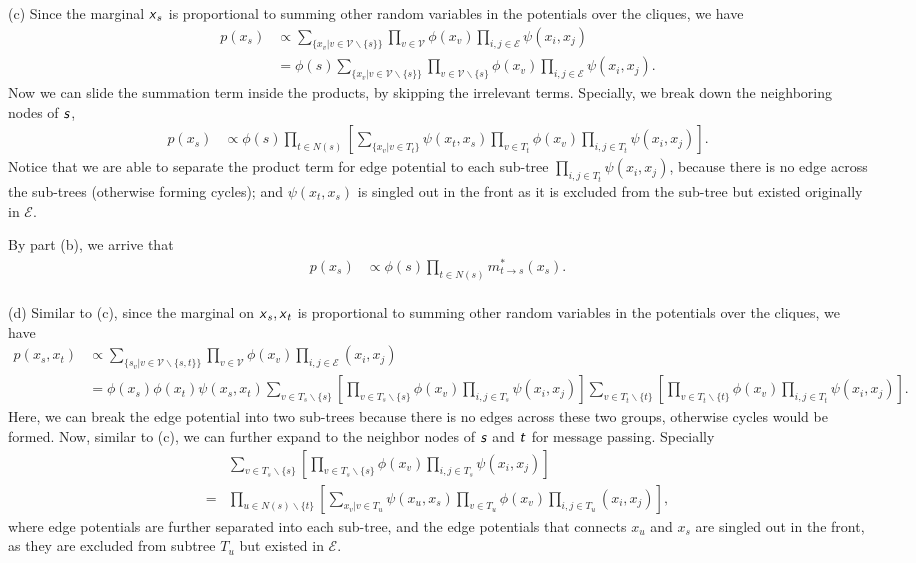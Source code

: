 \documentclass{article}
\newcommand{\s}[1]{\textsf{\textit{#1}}}
\newcommand{\qeds}{\hfill\qedsymbol}
\begin{document}
\noindent
(c) Since the marginal $\s{x}_s$ is proportional to summing other random variables in the potentials over the cliques, we have
\begin{align*}
	p(x_s) &\propto \sum_{\big\{x_v|v\in\mathscr{V}\backslash\{s\}\big\}}\prod_{v\in\mathscr{V}}\phi(x_v)\prod_{i,j\in\mathscr{E}}\psi(x_i, x_j)\\
	&=\phi(s) \sum_{\big\{x_v|v\in\mathscr{V}\backslash\{s\}\big\}}\prod_{v\in\mathscr{V}\backslash\{s\}}\phi(x_v)\prod_{i,j\in\mathscr{E}}\psi(x_i, x_j).
\end{align*}
%
Now we can slide the summation term inside the products, by skipping the irrelevant terms. Specially, we break down the neighboring nodes of $\s{s}$, 
%
\begin{align*}
	p(x_s) &\propto \phi(s) \prod_{t\in N(s)}\left[\sum_{\{x_v|v\in T_t\}}\psi(x_t, x_s)\prod_{v\in T_t}\phi(x_v)\prod_{i,j\in T_t}\psi(x_i, x_j)\right].
\end{align*}
Notice that we are able to separate the product term for edge potential to each
sub-tree $\prod_{i,j\in T_t}\psi(x_i, x_j)$, because there is no edge across the sub-trees (otherwise forming cycles); and $\psi(x_t, x_s)$ is singled out in the front as it is excluded from the sub-tree but existed originally in $\mathscr{E}$.

By part (b), we arrive that
\begin{align*}
	p(x_s) &\propto \phi(s) \prod_{t\in N(s)}m_{t\to s}^*(x_s).
\end{align*}\qeds
\\

\noindent
(d) Similar to (c), since the marginal on $\s{x}_s, \s{x}_t$ is proportional to summing other random variables in the potentials over the cliques, we have
\begin{align*}
	p(x_s, x_t) &\propto \sum_{\big\{s_v|v\in\mathscr{V}\backslash\{s,t\}\big\}}\prod_{v\in\mathscr{V}}\phi(x_v)\prod_{i,j\in\mathscr{E}}(x_i,x_j)\\
	&= \phi(x_s)\phi(x_t)\psi(x_s, x_t)
	\sum_{v\in T_s\backslash\{s\}}\left[\prod_{v\in T_s\backslash\{s\}}\phi(x_v)\prod_{i, j \in T_s}
	\psi(x_i,x_j)\right]
	\sum_{v\in T_t\backslash\{t\}}\left[\prod_{v\in T_t\backslash\{t\}}\phi(x_v)\prod_{i, j \in T_t}
	\psi(x_i,x_j)\right].
\end{align*}
Here, we can break the edge potential into two sub-trees because there is no edges across these two groups, otherwise cycles would be formed. Now, similar to (c), we can further expand to the neighbor nodes of $\s{s}$ and $\s{t}$ for message passing. Specially
\begin{align*}
	&\sum_{v\in T_s\backslash\{s\}}\left[\prod_{v\in T_s\backslash\{s\}}\phi(x_v)\prod_{i, j \in T_s}
	\psi(x_i,x_j)\right]\\
	=& \prod_{u\in N(s)\backslash\{t\}}\left[\sum_{x_v|v\in T_u}\psi(x_u, x_s)\prod_{v\in T_u}\phi(x_v)\prod_{i,j\in T_u}(x_i, x_j)\right],
\end{align*}
where edge potentials are further separated into each sub-tree, and the edge potentials that connects $x_u$ and $x_s$ are singled out in the front, as they are excluded from subtree $T_u$ but existed in $\mathscr{E}$.
\end{document}
